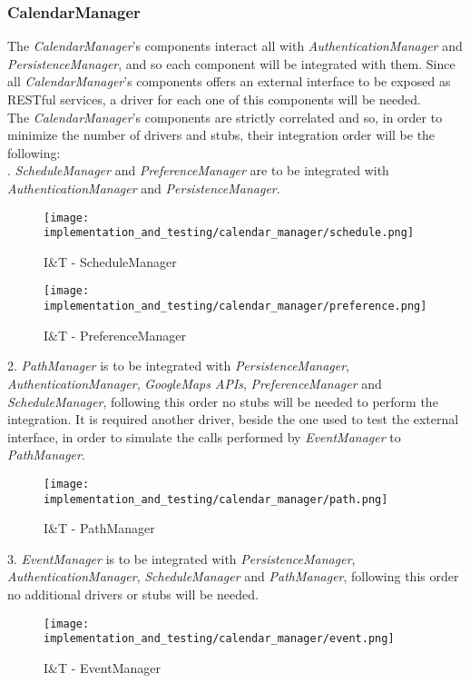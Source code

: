 \subsubsection{CalendarManager}
The \textit{CalendarManager}'s components interact all with \textit{AuthenticationManager} and \textit{PersistenceManager}, and so each component will be integrated with them. Since all \textit{CalendarManager}'s components offers an external interface to be exposed as RESTful services, a driver for each one of this components will be needed.\\
The \textit{CalendarManager}'s components are strictly correlated and so, in order to minimize the number of drivers and stubs, their integration order will be the following:\\
. \textit{ScheduleManager} and \textit{PreferenceManager} are to be integrated with \textit{AuthenticationManager} and \textit{PersistenceManager}.
\begin{figure}[H]
	\begin{center}
		\texttt{[image: implementation\_and\_testing/calendar\_manager/schedule.png]}
	\end{center}
	\caption{I\&T - ScheduleManager}
\end{figure}
\begin{figure}[H]
	\begin{center}
		\texttt{[image: implementation\_and\_testing/calendar\_manager/preference.png]}
	\end{center}
	\caption{I\&T - PreferenceManager}
\end{figure}

2. \textit{PathManager} is to be integrated with \textit{PersistenceManager}, \textit{AuthenticationManager}, \textit{GoogleMaps APIs}, \textit{PreferenceManager} and \textit{ScheduleManager}, following this order no stubs will be needed to perform the integration. It is required another driver, beside the one used to test the external interface, in order to simulate the calls performed by \textit{EventManager} to \textit{PathManager}.
\begin{figure}[H]
	\begin{center}
		\texttt{[image: implementation\_and\_testing/calendar\_manager/path.png]}
	\end{center}
	\caption{I\&T - PathManager}
\end{figure}

3. \textit{EventManager} is to be integrated with \textit{PersistenceManager}, \textit{AuthenticationManager}, \textit{ScheduleManager} and \textit{PathManager}, following this order no additional drivers or stubs will be needed.
\begin{figure}[H]
	\begin{center}
		\texttt{[image: implementation\_and\_testing/calendar\_manager/event.png]}
	\end{center}
	\caption{I\&T - EventManager}
\end{figure}

